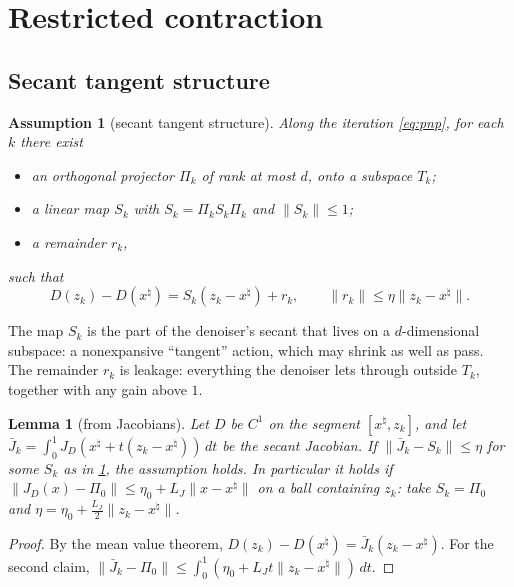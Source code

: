 \documentclass[11pt]{article}
\newtheorem{lemma}[theorem]{Lemma}
\newtheorem{assumption}[theorem]{Assumption}
\theoremstyle{definition}
\theoremstyle{remark}
\newcommand{\norm}[1]{\lVert #1\rVert}
\newcommand{\xt}{x^\natural}
\begin{document}
\section{Restricted contraction}\label{sec:restricted}

\subsection{Secant tangent structure}

\begin{assumption}[secant tangent structure]\label{ass:secant}
Along the iteration \eqref{eq:pnp}, for each $k$ there exist
\begin{itemize}
\item an orthogonal projector $\Pi_k$ of rank at most $d$, onto a subspace $T_k$;
\item a linear map $S_k$ with $S_k=\Pi_kS_k\Pi_k$ and $\norm{S_k}\leq1$;
\item a remainder $r_k$,
\end{itemize}
such that
\[
D(z_k)-D(\xt)=S_k(z_k-\xt)+r_k,\qquad\norm{r_k}\leq\eta\norm{z_k-\xt}.
\]
\end{assumption}

The map $S_k$ is the part of the denoiser's secant that lives on a $d$-dimensional subspace: a nonexpansive
``tangent'' action, which may shrink as well as pass. The remainder $r_k$ is leakage: everything the denoiser
lets through outside $T_k$, together with any gain above $1$.

\begin{lemma}[from Jacobians]\label{lem:jacobian}
Let $D$ be $C^1$ on the segment $[\xt,z_k]$, and let
$\bar J_k=\int_0^1J_D(\xt+t(z_k-\xt))\,dt$ be the secant Jacobian. If $\norm{\bar J_k-S_k}\leq\eta$ for some $S_k$
as in \cref{ass:secant}, the assumption holds. In particular it holds if $\norm{J_D(x)-\Pi_0}\leq\eta_0+L_J\norm{x-\xt}$
on a ball containing $z_k$: take $S_k=\Pi_0$ and $\eta=\eta_0+\tfrac{L_J}{2}\norm{z_k-\xt}$.
\end{lemma}
\begin{proof}
By the mean value theorem, $D(z_k)-D(\xt)=\bar J_k(z_k-\xt)$. For the second claim,
$\norm{\bar J_k-\Pi_0}\leq\int_0^1(\eta_0+L_Jt\norm{z_k-\xt})\,dt$.
\end{proof}
\end{document}
